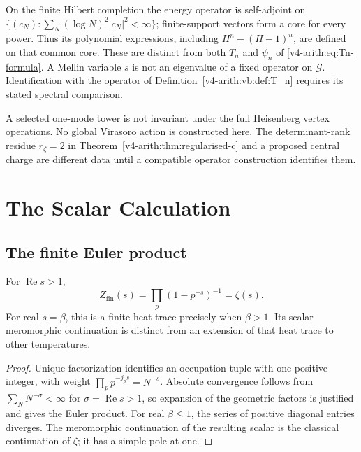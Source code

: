 \begin{remark}
\label{v4-arith:prim-zeta:rem:consistency-vb}
On the finite Hilbert completion the energy operator is self-adjoint on
\(\{(c_N):\sum_N(\log N)^2|c_N|^2<\infty\}\); finite-support
vectors form a core for every power. Thus its polynomial expressions,
including \(H^n-(H-1)^n\), are defined on that common core. These
are distinct from both \(T_n\) and \(\psi_n\) of
\eqref{v4-arith:eq:Tn-formula}. A Mellin variable \(s\) is not an
eigenvalue of a fixed operator on \(\mathcal G\).
Identification with the operator of
Definition~\ref{v4-arith:vb:def:T_n} requires its stated spectral comparison.
\end{remark}
\begin{remark}
\label{v4-arith:prim-zeta:rem:Virasoro-reconciliation}
A selected one-mode tower is not invariant under the full Heisenberg
vertex operations. No global Virasoro action is constructed here.
The determinant-rank residue \(r_\zeta=2\) in
Theorem~\ref{v4-arith:thm:regularised-c} and a proposed central charge are
different data until a compatible operator construction identifies them.
\end{remark}

\section{The Scalar Calculation}
\label{v4-arith:prim-zeta:statement}
\label{v4-arith:prim-zeta:character-primary}
\label{v4-arith:prim-zeta:table}
\subsection{The finite Euler product}
\label{v4-arith:prim-zeta:finite-char}
\begin{theorem}
\label{v4-arith:prim-zeta:thm:finite-char}
For \(\operatorname{Re}s>1\),
\begin{equation}
\label{v4-arith:prim-zeta:eq:finite-char}
 Z_{\mathrm{fin}}(s)=\prod_p(1-p^{-s})^{-1}=\zeta(s).
\end{equation}
For real \(s=\beta\), this is a finite heat trace precisely when
\(\beta>1\). Its scalar meromorphic continuation is distinct from an
extension of that heat trace to other temperatures.
\end{theorem}
\begin{proof}
Unique factorization identifies an occupation tuple with one positive
integer, with weight \(\prod_pp^{-j_ps}=N^{-s}\).
Absolute convergence follows from \(\sum_NN^{-\sigma}<\infty\) for
\(\sigma=\operatorname{Re}s>1\), so expansion of the geometric
factors is justified and gives the Euler product.
For real \(\beta\le1\), the series of positive diagonal entries
diverges. The meromorphic continuation of the resulting scalar is the
classical continuation of \(\zeta\); it has a simple pole at one.
\end{proof}

